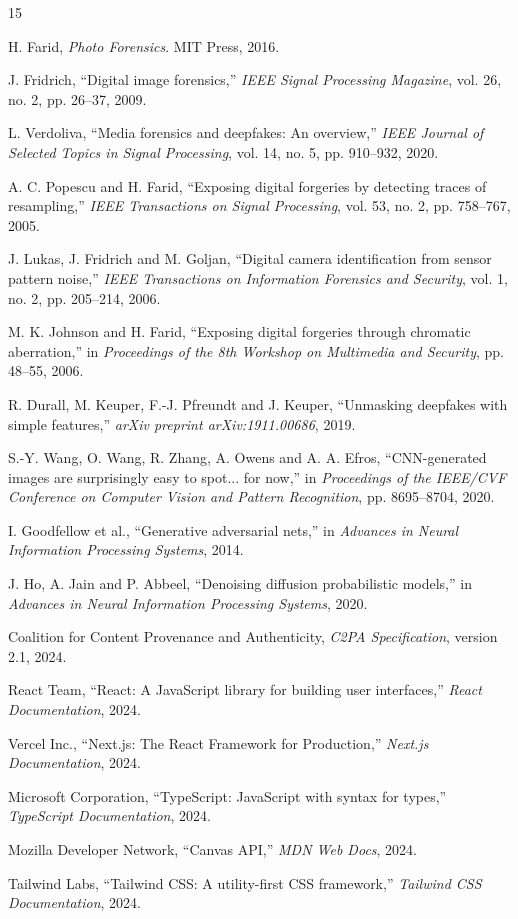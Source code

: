 \begin{thebibliography}{15}

 H. Farid, \textit{Photo Forensics}. MIT Press, 2016.

 J. Fridrich, ``Digital image forensics,'' \textit{IEEE Signal Processing Magazine}, vol. 26, no. 2, pp. 26--37, 2009.

 L. Verdoliva, ``Media forensics and deepfakes: An overview,'' \textit{IEEE Journal of Selected Topics in Signal Processing}, vol. 14, no. 5, pp. 910--932, 2020.

 A. C. Popescu and H. Farid, ``Exposing digital forgeries by detecting traces of resampling,'' \textit{IEEE Transactions on Signal Processing}, vol. 53, no. 2, pp. 758--767, 2005.

 J. Lukas, J. Fridrich and M. Goljan, ``Digital camera identification from sensor pattern noise,'' \textit{IEEE Transactions on Information Forensics and Security}, vol. 1, no. 2, pp. 205--214, 2006.

 M. K. Johnson and H. Farid, ``Exposing digital forgeries through chromatic aberration,'' in \textit{Proceedings of the 8th Workshop on Multimedia and Security}, pp. 48--55, 2006.

 R. Durall, M. Keuper, F.-J. Pfreundt and J. Keuper, ``Unmasking deepfakes with simple features,'' \textit{arXiv preprint arXiv:1911.00686}, 2019.

 S.-Y. Wang, O. Wang, R. Zhang, A. Owens and A. A. Efros, ``CNN-generated images are surprisingly easy to spot... for now,'' in \textit{Proceedings of the IEEE/CVF Conference on Computer Vision and Pattern Recognition}, pp. 8695--8704, 2020.

 I. Goodfellow et al., ``Generative adversarial nets,'' in \textit{Advances in Neural Information Processing Systems}, 2014.

 J. Ho, A. Jain and P. Abbeel, ``Denoising diffusion probabilistic models,'' in \textit{Advances in Neural Information Processing Systems}, 2020.

 Coalition for Content Provenance and Authenticity, \textit{C2PA Specification}, version 2.1, 2024.

 React Team, ``React: A JavaScript library for building user interfaces,'' \textit{React Documentation}, 2024.

 Vercel Inc., ``Next.js: The React Framework for Production,'' \textit{Next.js Documentation}, 2024.

 Microsoft Corporation, ``TypeScript: JavaScript with syntax for types,'' \textit{TypeScript Documentation}, 2024.

 Mozilla Developer Network, ``Canvas API,'' \textit{MDN Web Docs}, 2024.

 Tailwind Labs, ``Tailwind CSS: A utility-first CSS framework,'' \textit{Tailwind CSS Documentation}, 2024.

\end{thebibliography}

